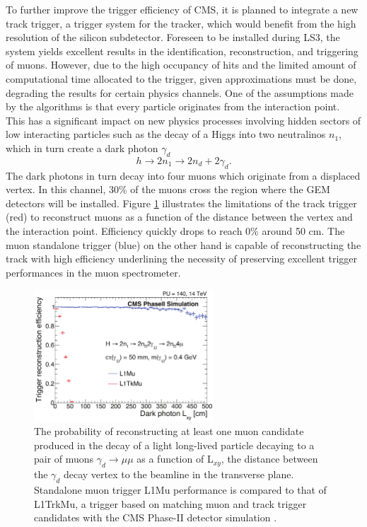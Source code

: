     To further improve the trigger efficiency of CMS, it is planned to integrate a new track trigger, a trigger system for the tracker, which would benefit from the high resolution of the silicon subdetector. Foreseen to be installed during LS3, the system yields excellent results in the identification, reconstruction, and triggering of muons. However, due to the high occupancy of hits and the limited amount of computational time allocated to the trigger, given approximations must be done, degrading the results for certain physics channels. One of the assumptions made by the algorithms is that every particle originates from the interaction point. This has a significant impact on new physics processes involving hidden sectors of low interacting particles such as the decay of a Higgs into two neutralinos $ n_1 $, which in turn create a dark photon $ \gamma_d $
    \begin{equation}
      h \rightarrow 2 n_1 \rightarrow 2 n_d + 2 \gamma_d .
    \end{equation}
    The dark photons in turn decay into four muons which originate from a displaced vertex. In this channel, 30\% of the muons cross the region where the GEM detectors will be installed. Figure \ref{fig:II-1-dark-photon} illustrates the limitations of the track trigger (red) to reconstruct muons as a function of the distance between the vertex and the interaction point. Efficiency quickly drops to reach 0\% around 50 cm. The muon standalone trigger (blue) on the other hand is capable of reconstructing the track with high efficiency underlining the necessity of preserving excellent trigger performances in the muon spectrometer.

    \begin{figure}[t!]
      \centering
      \includegraphics[width=0.6\textwidth]{img/II-1-gem/dark-photon.pdf}
      \caption{The probability of reconstructing at least one muon candidate produced in the decay of a light long-lived particle decaying to a pair of muons $\gamma_d \rightarrow \mu \mu $ as a function of L$_{xy}$, the distance between the $\gamma_d$ decay vertex to the beamline in the transverse plane. Standalone muon trigger L1Mu performance is compared to that of L1TrkMu, a trigger based on matching muon and track trigger candidates with the CMS Phase-II detector simulation \cite{Colaleo:2021453}.}
      \label{fig:II-1-dark-photon}
    \end{figure}

